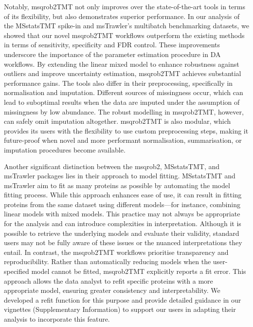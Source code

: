 \documentclass[
  letterpaper,
  DIV=11,
  numbers=noendperiod]{scrartcl}
\begin{document}
Notably, msqrob2TMT not only improves over the state-of-the-art tools in
terms of its flexibility, but also demonstrates superior performance. In
our analysis of the MSstatsTMT spike-in and msTrawler's multibatch
benchmarking datasets, we showed that our novel msqrob2TMT workflows
outperform the existing methods in terms of sensitivity, specificity and
FDR control. These improvements underscore the importance of the
parameter estimation procedure in DA workflows. By extending the linear
mixed model to enhance robustness against outliers and improve
uncertainty estimation, msqrob2TMT achieves substantial performance
gains. The tools also differ in their preprocessing, specifically in
normalisation and imputation. Different sources of missingness occur,
which can lead to suboptimal results when the data are imputed under the
assumption of missingness by low abundance. The robust modelling in
msqrob2TMT, however, can safely omit imputation altogether. msqrob2TMT
is also modular, which provides its users with the flexibility to use
custom preprocessing steps, making it future-proof when novel and more
performant normalisation, summarisation, or imputation procedures become
available.

Another significant distinction between the msqrob2, MSstatsTMT, and
msTrawler packages lies in their approach to model fitting. MSstatsTMT
and msTrawler aim to fit as many proteins as possible by automating the
model fitting process. While this approach enhances ease of use, it can
result in fitting proteins from the same dataset using different
models---for instance, combining linear models with mixed models. This
practice may not always be appropriate for the analysis and can
introduce complexities in interpretation. Although it is possible to
retrieve the underlying models and evaluate their validity, standard
users may not be fully aware of these issues or the nuanced
interpretations they entail. In contrast, the msqrob2TMT workflows
prioritise transparency and reproducibility. Rather than automatically
reducing models when the user-specified model cannot be fitted,
msqrob2TMT explicitly reports a fit error. This approach allows the data
analyst to refit specific proteins with a more appropriate model,
ensuring greater consistency and interpretability. We developed a refit
function for this purpose and provide detailed guidance in our vignettes
(Supplementary Information) to support our users in adapting their
analysis to incorporate this feature.
\end{document}
